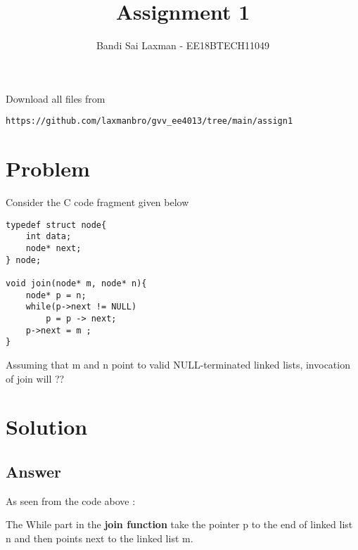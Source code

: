 \documentclass[journal,12pt,twocolumn]{IEEEtran}
\begin{document}
     \def\rightbox#1{\makebox[0in][r]{#1}}
     \def\centbox#1{\makebox[0in]{#1}}
     \def\topbox#1{\raisebox{-\baselineskip}[0in][0in]{#1}}
     \def\midbox#1{\raisebox{-0.5\baselineskip}[0in][0in]{#1}}
\vspace{3cm}
\title{Assignment 1}
\author{Bandi Sai Laxman - EE18BTECH11049}
\maketitle
\newpage
\bigskip
\renewcommand{\thefigure}{\theenumi}
\renewcommand{\thetable}{\theenumi}
Download all files from 
%
\begin{lstlisting}
https://github.com/laxmanbro/gvv_ee4013/tree/main/assign1
\end{lstlisting}
\section{Problem}
Consider the C code fragment given below
\begin{lstlisting}
typedef struct node{
    int data;
    node* next;
} node;

void join(node* m, node* n){
    node* p = n;
    while(p->next != NULL)
        p = p -> next;
    p->next = m ;
}

\end{lstlisting}
Assuming that m and n point to valid NULL-terminated linked lists, invocation of join will ??

\section{Solution}

\subsection{Answer}


As seen from the code above :

The While part in the \textbf{ join function }  take the pointer p to the end of linked list n and then points next to the linked list m. 
\newline
\end{document}
